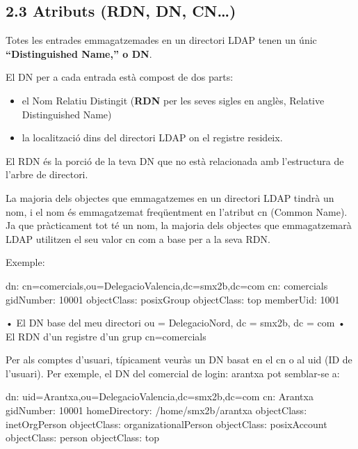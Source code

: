 \documentclass[
  12 pt,
  a4paper,
]{article}
\newenvironment{Shaded}{\begin{snugshade}}{\end{snugshade}}
\newcommand{\ExtensionTok}[1]{#1}
\newcommand{\NormalTok}[1]{#1}
\providecommand{\tightlist}{%
  \setlength{\itemsep}{0pt}\setlength{\parskip}{0pt}}
\begin{document}
\subsection{2.3 Atributs (RDN, DN, CN\ldots)}\label{atributs-rdn-dn-cn}

Totes les entrades emmagatzemades en un directori LDAP tenen un únic
\textbf{``Distinguished Name,'' o DN}.

El DN per a cada entrada està compost de dos parts:

\begin{itemize}
\tightlist
\item
  el Nom Relatiu Distingit (\textbf{RDN} per les seves sigles en anglès,
  Relative Distinguished Name)
\item
  la localització dins del directori LDAP on el registre resideix.
\end{itemize}

El RDN és la porció de la teva DN que no està relacionada amb
l'estructura de l'arbre de directori.

La majoria dels objectes que emmagatzemes en un directori LDAP tindrà un
nom, i el nom és emmagatzemat freqüentment en l'atribut cn (Common
Name). Ja que pràcticament tot té un nom, la majoria dels objectes que
emmagatzemarà LDAP utilitzen el seu valor cn com a base per a la seva
RDN.

Exemple:

\begin{Shaded}
\begin{Highlighting}[]
\ExtensionTok{dn:}\NormalTok{ cn=comercials,ou=DelegacioValencia,dc=smx2b,dc=com}
\ExtensionTok{cn:}\NormalTok{ comercials}
\ExtensionTok{gidNumber:}\NormalTok{ 10001}
\ExtensionTok{objectClass:}\NormalTok{ posixGroup}
\ExtensionTok{objectClass:}\NormalTok{ top}
\ExtensionTok{memberUid:}\NormalTok{ 1001}
\end{Highlighting}
\end{Shaded}

• El DN base del meu directori ou = DelegacioNord, dc = smx2b, dc = com
• El RDN d'un registre d'un grup cn=comercials

Per als comptes d'usuari, típicament veuràs un DN basat en el cn o al
uid (ID de l'usuari). Per exemple, el DN del comercial de login: arantxa
pot semblar-se a:

\begin{Shaded}
\begin{Highlighting}[]
\ExtensionTok{dn:}\NormalTok{ uid=Arantxa,ou=DelegacioValencia,dc=smx2b,dc=com}
\ExtensionTok{cn:}\NormalTok{ Arantxa}
\ExtensionTok{gidNumber:}\NormalTok{ 10001}
\ExtensionTok{homeDirectory:}\NormalTok{ /home/smx2b/arantxa}
\ExtensionTok{objectClass:}\NormalTok{ inetOrgPerson}
\ExtensionTok{objectClass:}\NormalTok{ organizationalPerson}
\ExtensionTok{objectClass:}\NormalTok{ posixAccount}
\ExtensionTok{objectClass:}\NormalTok{ person}
\ExtensionTok{objectClass:}\NormalTok{ top}
\end{Highlighting}
\end{Shaded}
\end{document}
